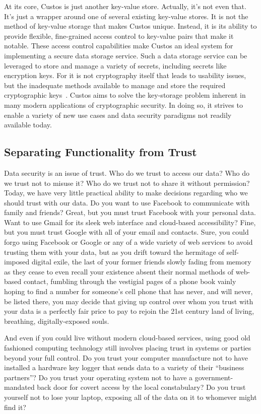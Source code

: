At its core, Custos is just another key-value store. Actually, it's
not even that. It's just a wrapper around one of several existing
key-value stores. It is not the method of key-value storage that makes
Custos unique. Instead, it is its ability to provide flexible,
fine-grained access control to key-value pairs that make it
notable. These access control capabilities make Custos an ideal system
for implementing a secure data storage service. Such a data storage
service can be leveraged to store and manage a variety of secrets,
including secrets like encryption keys. For it is not cryptography
itself that leads to usability issues, but the inadequate methods
available to manage and store the required cryptographic
keys~\cite{Kher2005}. Custos aims to solve the key-storage problem
inherent in many modern applications of cryptographic security. In
doing so, it strives to enable a variety of new use cases and data
security paradigms not readily available today.

\subsection{Separating Functionality from Trust}

Data security is an issue of trust. Who do we trust to access our
data? Who do we trust not to misuse it? Who do we trust not to share
it without permission? Today, we have very little practical ability to
make decisions regarding who we should trust with our data. Do you
want to use Facebook to communicate with family and friends? Great,
but you must trust Facebook with your personal data. Want to use Gmail
for its sleek web interface and cloud-based accessibility? Fine, but
you must trust Google with all of your email and contacts. Sure, you
could forgo using Facebook or Google or any of a wide variety of web
services to avoid trusting them with your data, but as you drift toward
the hermitage of self-imposed digital exile, the last of your former
friends slowly fading from memory as they cease to even recall your
existence absent their normal methods of web-based contact, fumbling
through the vestigial pages of a phone book vainly hoping to find a
number for someone's cell phone that has never, and will never, be
listed there, you may decide that giving up control over whom you
trust with your data is a perfectly fair price to pay to rejoin the
21st century land of living, breathing, digitally-exposed souls.

And even if you could live without modern cloud-based services, using
good old fashioned computing technology still involves placing trust
in systems or parties beyond your full control. Do you trust your
computer manufacture not to have installed a hardware key logger that
sends data to a variety of their ``business partners''? Do you trust
your operating system not to have a government-mandated back door for
covert access by the local constabulary?  Do you trust yourself not to
lose your laptop, exposing all of the data on it to whomever might
find it?

